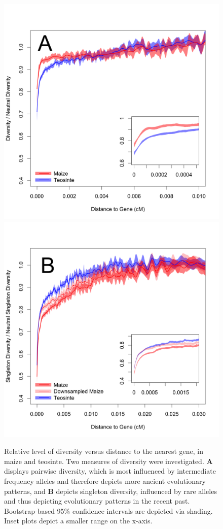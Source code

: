 \documentclass{pnastwo}
\newcommand{\jri}[1]{\textcolor{red}{\scriptsize #1}}
\begin{document}
\begin{article}
\begin{figure}[!htb]
\centering
\includegraphics[width=.45\textwidth]{FigsAndFiles/distanceToGene_WithSignificance_Folded2_manuscript.png} \includegraphics[width=.45\textwidth]{FigsAndFiles/distanceToGene_WithSignificance_Singletons_Downsampled_threeLines_manuscript.png}
\caption{Relative level of diversity versus distance to the nearest
  gene, in maize and teosinte. Two measures of diversity were
  investigated. \textbf{A} displays pairwise
  diversity, which is most influenced by intermediate frequency
  alleles and therefore depicts more ancient evolutionary patterns,
  and \textbf{B} depicts singleton diversity, influenced by rare
  alleles and thus depicting evolutionary patterns in the recent
  past. Bootstrap-based 95\% confidence intervals are depicted via shading. Inset plots depict a smaller range on the x-axis. \label{fig:purify}
  }
\end{figure}



\end{article}
\end{document}
